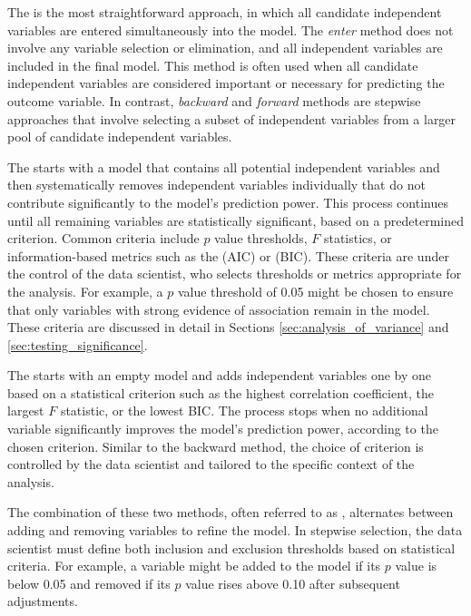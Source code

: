 \bigskip
The  is the most straightforward approach, in which all candidate independent variables are entered simultaneously into the model. The \emph{enter} method does not involve any variable selection or elimination, and all independent variables are included in the final model. This method is often used when all candidate independent variables are considered important or necessary for predicting the outcome variable. In contrast, \emph{backward} and \emph{forward} methods are stepwise approaches that involve selecting a subset of independent variables from a larger pool of candidate independent variables.

The  starts with a model that contains all potential independent variables and then systematically removes independent variables individually that do not contribute significantly to the model's prediction power. This process continues until all remaining variables are statistically significant, based on a predetermined criterion. Common criteria include $p$ value thresholds, $F$ statistics, or information-based metrics such as the  (AIC) or  (BIC). These criteria are under the control of the data scientist, who selects thresholds or metrics appropriate for the analysis. For example, a $p$ value threshold of 0.05 might be chosen to ensure that only variables with strong evidence of association remain in the model. These criteria are discussed in detail in Sections \ref{sec:analysis_of_variance} and \ref{sec:testing_significance}.

The  starts with an empty model and adds independent variables one by one based on a statistical criterion such as the highest correlation coefficient, the largest $F$ statistic, or the lowest BIC. The process stops when no additional variable significantly improves the model’s prediction power, according to the chosen criterion. Similar to the backward method, the choice of criterion is controlled by the data scientist and tailored to the specific context of the analysis.

The combination of these two methods, often referred to as , alternates between adding and removing variables to refine the model. In stepwise selection, the data scientist must define both inclusion and exclusion thresholds based on statistical criteria. For example, a variable might be added to the model if its $p$ value is below 0.05 and removed if its $p$ value rises above 0.10 after subsequent adjustments. 

